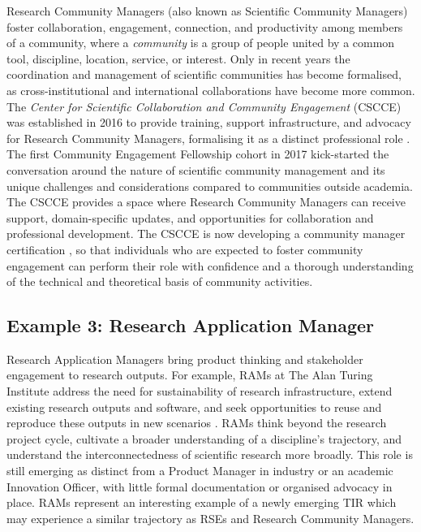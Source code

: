 \documentclass[authordate,meta]{jote-new-article}
\begin{document}
Research Community Managers (also known as Scientific Community Managers) foster collaboration, engagement, connection, and productivity among members of a community, where a \emph{community }is a group of people united by a common tool, discipline, location, service, or interest. Only in recent years the coordination and management of scientific communities has become formalised, as cross-institutional and international collaborations have become more common. The \emph{Center for Scientific Collaboration and Community Engagement} (CSCCE) was established in 2016 to provide training, support infrastructure, and advocacy for Research Community Managers, formalising it as a distinct professional role \parencites{CSCCE2022}. The first Community Engagement Fellowship cohort in 2017 kick-started the conversation around the nature of scientific community management and its unique challenges and considerations compared to communities outside academia. The CSCCE provides a space where Research Community Managers can receive support, domain-specific updates, and opportunities for collaboration and professional development. The CSCCE is now developing a community manager certification \parencites{CSCCE2022a}, so that individuals who are expected to foster community engagement can perform their role with confidence and a thorough understanding of the technical and theoretical basis of community activities.



\subsection{Example 3: Research Application Manager}



Research Application Managers \parencites[RAMs;][]{TheTuringWayCommunityRecord2022a} bring product thinking and stakeholder engagement to research outputs. For example, RAMs at The Alan Turing Institute address the need for sustainability of research infrastructure, extend existing research outputs and software, and seek opportunities to reuse and reproduce these outputs in new scenarios \parencites{TheTuringWayCommunityRecord2022a}. RAMs think beyond the research project cycle, cultivate a broader understanding of a discipline's trajectory, and understand the interconnectedness of scientific research more broadly. This role is still emerging as distinct from a Product Manager in industry or an academic Innovation Officer, with little formal documentation or organised advocacy in place. RAMs represent an interesting example of a newly emerging TIR which may experience a similar trajectory as RSEs and Research Community Managers.
\end{document}
